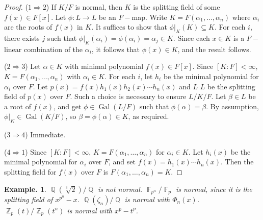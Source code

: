 \documentclass[11pt, a4paper]{memoir}
\DeclareMathOperator{\Q}{{\mathbb{Q}}}
\DeclareMathOperator{\Z}{{\mathbb{Z}}}
\DeclareMathOperator{\F}{{\mathbb{F}}}
\newcommand{\imp}[2]{($#1\Rightarrow#2$)\hspace{0.2cm}}
\theoremstyle{change}
\theoremstyle{plain}
\theoremstyle{nonumberplain}
\newtheorem{example}{Example.}
\newtheorem{proof}{Proof}
\DeclareMathOperator{\Gal}{Gal}
\numberwithin{equation}{section}
\begin{document}
\begin{proof}
    \imp{1}{2}
    If $K/F$ is normal, then $K$ is the splitting field of some $f(x)\in F[x]$.
    Let $\phi:L\to L$ be an $F-$map.
    Write $K=F(\alpha_1,\ldots,\alpha_n)$ where $\alpha_i$ are the roots of $f(x)$ in $K$.
    It suffices to show that $\phi|_K(K)\subseteq K$.
    For each $i$, there exists $j$ such that $\phi|_K(\alpha_i)=\phi(\alpha_i)=\alpha_j\in K$.
    Since each $x\in K$ is a $F-$linear combination of the $\alpha_i$, it follows that $\phi(x)\in K$, and the result follows.

    \imp{2}{3}
    Let $\alpha\in K$ with minimal polynomial $f(x)\in F[x]$.
    Since $[K:F]<\infty$, $K=F(\alpha_1,\ldots,\alpha_n)$ with $\alpha_i\in K$.
    For each $i$, let $h_i$ be the minimal polynomial for $\alpha_i$ over $F$.
    Let $p(x)=f(x)h_1(x)h_2(x)\cdots h_n(x)$ and $L$ $L$ be the splitting field of $p(x)$ over $F$.
    Such a choice is necessary to ensure $L/K/F$.
    Let $\beta\in L$ be a root of $f(x)$, and get $\phi\in\Gal(L/F)$ such that $\phi(\alpha)=\beta$.
    By assumption, $\phi|_K\in\Gal(K/F)$, so $\beta=\phi(\alpha)\in K$, as required.

    \imp{3}{4}
    Immediate.

    \imp{4}{1}
    Since $[K:F]<\infty$, $K=F(\alpha_1,\ldots,\alpha_n)$ for $\alpha_i\in K$.
    Let $h_i(x)$ be the minimal polynomial for $\alpha_i$ over $F$, and set $f(x)=h_1(x)\cdots h_n(x)$.
    Then the splitting field for $f(x)$ over $F$ is $F(\alpha_1,\ldots,\alpha_n)=K$.
\end{proof}
\begin{example}
    $\Q(\sqrt[3]{2})/\Q$ is not normal.
    $\F_{p^n}/\F_p$ is normal, since it is the splitting field of $x^{p^n}-x$.
    $\Q(\zeta_n)/\Q$ is normal with $\Phi_n(x)$.
    $\Z_p(t)/\Z_p(t^n)$ is normal with $x^p-t^p$.
\end{example}
\end{document}
